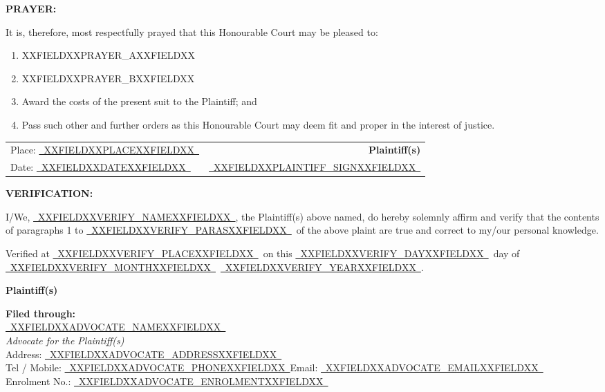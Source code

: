 \documentclass[12pt,a4paper]{article}
\newcommand{\fillline}[1]{\underline{~#1~}}
\begin{document}
\vspace{14pt}

\textbf{PRAYER:}

It is, therefore, most respectfully prayed that this Honourable Court may
be pleased to:

\begin{enumerate}[leftmargin=*, label=(\alph*), itemsep=6pt, topsep=4pt]
  \item XXFIELDXXPRAYER_AXXFIELDXX
  \item XXFIELDXXPRAYER_BXXFIELDXX
  \item Award the costs of the present suit to the Plaintiff; and
  \item Pass such other and further orders as this Honourable Court may
        deem fit and proper in the interest of justice.
\end{enumerate}

\vspace{20pt}

\noindent
\begin{tabularx}{\textwidth}{@{}X r@{}}
  Place: \fillline{XXFIELDXXPLACEXXFIELDXX} & \textbf{Plaintiff(s)} \\[10pt]
  Date: \fillline{XXFIELDXXDATEXXFIELDXX}  & \fillline{XXFIELDXXPLAINTIFF_SIGNXXFIELDXX} \\
\end{tabularx}

\vspace{20pt}

\textbf{VERIFICATION:}

I/We, \fillline{XXFIELDXXVERIFY_NAMEXXFIELDXX}, the Plaintiff(s) above named, do hereby solemnly
affirm and verify that the contents of paragraphs 1 to \fillline{XXFIELDXXVERIFY_PARASXXFIELDXX}\ of
the above plaint are true and correct to my/our personal knowledge.

\vspace{10pt}
Verified at \fillline{XXFIELDXXVERIFY_PLACEXXFIELDXX}\ on this \fillline{XXFIELDXXVERIFY_DAYXXFIELDXX}\ day of
\fillline{XXFIELDXXVERIFY_MONTHXXFIELDXX}\ \fillline{XXFIELDXXVERIFY_YEARXXFIELDXX}.

\vspace{18pt}
\hfill\textbf{Plaintiff(s)}

\vspace{20pt}

\textbf{Filed through:}\\[6pt]
\fillline{XXFIELDXXADVOCATE_NAMEXXFIELDXX}\\
\textit{Advocate for the Plaintiff(s)}\\[4pt]
Address: \fillline{XXFIELDXXADVOCATE_ADDRESSXXFIELDXX}\\[4pt]
Tel / Mobile: \fillline{XXFIELDXXADVOCATE_PHONEXXFIELDXX}\quad Email: \fillline{XXFIELDXXADVOCATE_EMAILXXFIELDXX}\\[4pt]
Enrolment No.: \fillline{XXFIELDXXADVOCATE_ENROLMENTXXFIELDXX}
\end{document}
